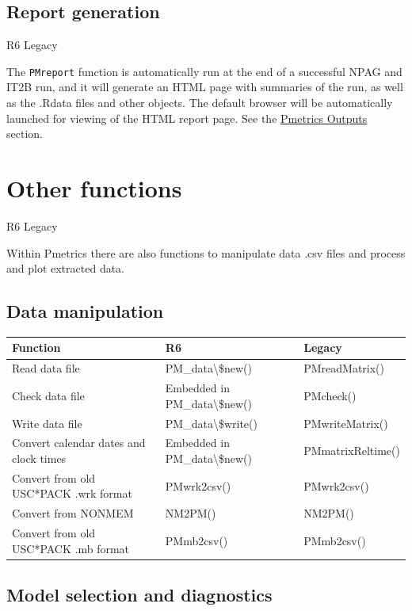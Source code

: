 \documentclass[
]{book}
\begin{document}
\hypertarget{report-generation}{%
\subsection{Report generation}\label{report-generation}}

{R6} {Legacy}

The \texttt{PMreport} function is automatically run at the end of a successful
NPAG and IT2B run, and it will generate an HTML page with summaries of
the run, as well as the .Rdata files and other objects. The default
browser will be automatically launched for viewing of the HTML report
page. See the \protect\hyperlink{outputs}{Pmetrics
Outputs} section.

\hypertarget{other-functions}{%
\section{Other functions}\label{other-functions}}

{R6} {Legacy}

Within Pmetrics there are also functions to manipulate data .csv files
and process and plot extracted data.

\hypertarget{data-manipulation}{%
\subsection{Data manipulation}\label{data-manipulation}}

\begin{tabular}{l|l|l}
\hline
Function & R6 & Legacy\\
\hline
Read data file & PM\_data\textbackslash{}\$new() & PMreadMatrix()\\
\hline
Check data file & Embedded in PM\_data\textbackslash{}\$new() & PMcheck()\\
\hline
Write data file & PM\_data\textbackslash{}\$write() & PMwriteMatrix()\\
\hline
Convert calendar dates and clock times & Embedded in PM\_data\textbackslash{}\$new() & PMmatrixReltime()\\
\hline
Convert from old USC*PACK .wrk format & PMwrk2csv() & PMwrk2csv()\\
\hline
Convert from NONMEM & NM2PM() & NM2PM()\\
\hline
Convert from old USC*PACK .mb format & PMmb2csv() & PMmb2csv()\\
\hline
\end{tabular}

\hypertarget{model-selection-and-diagnostics}{%
\subsection{Model selection and diagnostics}\label{model-selection-and-diagnostics}}
\end{document}

